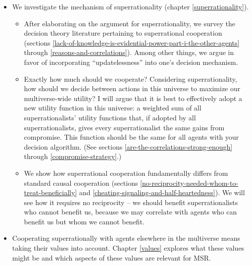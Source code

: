 \begin{itemize}
\item
  We investigate the mechanism of superrationality (chapter
  \ref{superrationality}).

  \begin{itemize}
  \item
    After elaborating on the argument for superrationality, we survey
    the decision theory literature pertaining to superrational
    cooperation (sections
    \ref{lack-of-knowledge-is-evidential-power-part-i-the-other-agents}
    through \ref{reasons-and-correlations}). Among other things, we argue in favor of
    incorporating ``updatelessness'' into one's decision mechanism.
  \item
    Exactly how much should we cooperate? Considering superrationality,
    how should we decide between actions in this universe to maximize
    our multiverse-wide utility? I will argue that it is best to
    effectively adopt a new utility function in this universe: a
    weighted sum of all superrationalists' utility functions that, if
    adopted by all superrationalists, gives every superrationalist the
    same gains from compromise. This function should be the same for all
    agents with your decision algorithm. (See sections
    \ref{are-the-correlations-strong-enough} through
    \ref{compromise-strategy}.)
  \item
    We show how superrational cooperation fundamentally differs from
    standard causal cooperation (sections
    \ref{no-reciprocity-needed-whom-to-treat-beneficially} and
    \ref{cheating-signaling-and-half-heartedness}). We will see how it requires no
    reciprocity -- we should benefit superrationalists who cannot
    benefit us, because we may correlate with agents who can benefit us
    but whom we cannot benefit.
  \end{itemize}
\item
  Cooperating superrationally with agents elsewhere in the multiverse
  means taking their values into account. Chapter
  \ref{values} explores what these
  values might be and which aspects of these values are relevant for
  MSR.


\end{itemize}
